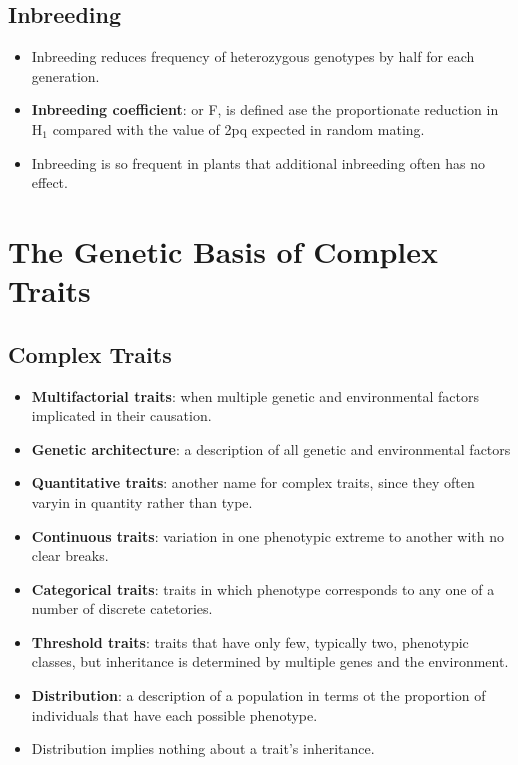 \documentclass[12pt,a4paper]{article}
\begin{document}
\subsection{Inbreeding}
\begin{itemize}
    \item Inbreeding reduces frequency of heterozygous genotypes by half for each generation.
    \item \textbf{Inbreeding coefficient}: or F, is defined ase the proportionate reduction in H\(_{1}\) compared with the value of 2pq expected in random mating.
    \item Inbreeding is so frequent in plants that additional inbreeding often has no effect.
\end{itemize}

\clearpage
\section{The Genetic Basis of Complex Traits}
\subsection{Complex Traits}
\begin{itemize}
    \item \textbf{Multifactorial traits}: when multiple genetic and environmental factors implicated in their causation.
    \item \textbf{Genetic architecture}: a description of all genetic and environmental factors 
    \item \textbf{Quantitative traits}: another name for complex traits, since they often varyin in quantity rather than type.
    \item \textbf{Continuous traits}: variation in one phenotypic extreme to another with no clear breaks.
    \item \textbf{Categorical traits}: traits in which phenotype corresponds to any one of a number of discrete catetories.
    \item \textbf{Threshold traits}: traits that have only few, typically two, phenotypic classes, but inheritance is determined by multiple genes and the environment.
    \item \textbf{Distribution}: a description of a population in terms ot the proportion of individuals that have each possible phenotype.
    \item Distribution implies nothing about a trait's inheritance.
\end{itemize}
\end{document}
